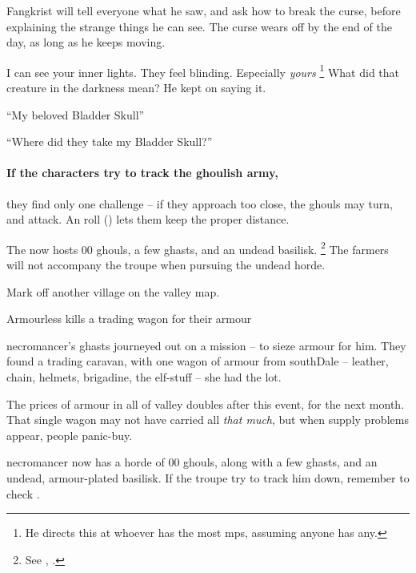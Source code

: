 Fangkrist will tell everyone what he saw, and ask how to break the curse, before explaining the strange things he can see.
The curse wears off by the end of the day, as long as he keeps moving.

\begin{speechtext}
  I can see your inner lights.
  They feel blinding.
  Especially \emph{yours}%
  \footnote{He directs this at whoever has the most \glspl{mp}, assuming anyone has any.}
  What did that creature in the darkness mean?
  He kept on saying it.

  ``My beloved Bladder Skull''

  ``Where did they take my Bladder Skull?''
\end{speechtext}

\paragraph{If the characters try to track the ghoulish army,}
they find only one challenge -- if they approach too close, the ghouls may turn, and attack.
An  roll (\tn[10]) lets them keep the proper distance.

The  now hosts 00 ghouls, a few ghasts, and an undead basilisk.%
\footnote{See , .}
The farmers will not accompany the troupe when pursuing the undead horde.

Mark off another \gls{village} on the \gls{valley} map.


{\squash Armourless}%
{ kills a trading wagon for their armour}%

\begin{exampletext}
  \Gls{necromancer}'s ghasts journeyed out on a mission -- to sieze armour for him.
  They found a trading caravan, with one wagon of armour from \gls{southDale} -- leather, chain, helmets, brigadine, the elf-stuff -- she had the lot.
\end{exampletext}

The prices of armour in all of \gls{valley} doubles after this event, for the next month.
That single wagon may not have carried all \emph{that much}, but when supply problems appear, people panic-buy.

\Gls{necromancer} now has a horde of 00 ghouls, along with a few ghasts, and an undead, armour-plated basilisk.
If the troupe try to track him down, remember to check .

